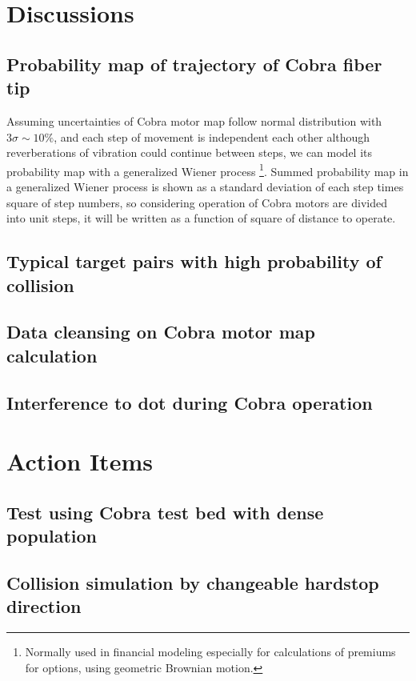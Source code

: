 \documentclass[a4paper,notitlepage]{article}
\begin{document}
\section{Discussions}

\subsection{Probability map of trajectory of Cobra fiber tip}

Assuming uncertainties of Cobra motor map follow normal distribution with 
$3\sigma\sim 10\%$, and each step of movement is independent each other 
although reverberations of vibration could continue between steps, we can 
model its probability map with a generalized Wiener process
\footnote{Normally used in financial modeling especially for calculations of 
premiums for options, using geometric Brownian motion.}.
Summed probability map in a generalized Wiener process is shown as a standard 
deviation of each step times square of step numbers, so considering operation 
of Cobra motors are divided into unit steps, it will be written as a function 
of square of distance to operate. 


\subsection{Typical target pairs with high probability of collision}


\subsection{Data cleansing on Cobra motor map calculation}


\subsection{Interference to dot during Cobra operation}


\section{Action Items}

\subsection{Test using Cobra test bed with dense population}

\subsection{Collision simulation by changeable hardstop direction}
\end{document}

